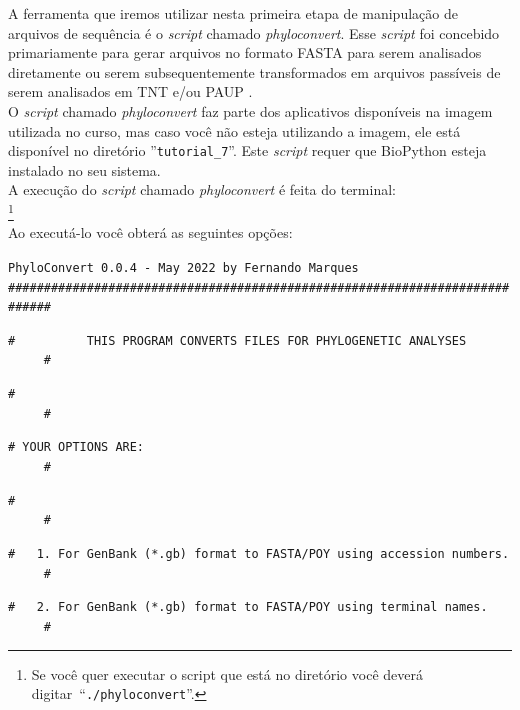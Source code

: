 \begin{refsection}
A ferramenta que iremos utilizar nesta primeira etapa de manipulação de arquivos de sequência é o \textit{script} chamado  \textit{phyloconvert}. Esse \textit{script} foi concebido primariamente para gerar arquivos no formato FASTA para serem analisados diretamente ou serem subsequentemente transformados em arquivos passíveis de serem analisados em TNT e/ou PAUP \parencite{Swofford_2003,GoloboffEtAl_2008}.\\

O \textit{script} chamado \textit{phyloconvert} faz parte dos aplicativos disponíveis na imagem utilizada no curso, mas caso você não esteja utilizando a imagem, ele está disponível no diretório ''\texttt{tutorial\_7}''. Este \textit{script} requer que BioPython esteja instalado no seu sistema.\\

	A execução do \textit{script} chamado \textit{phyloconvert} é feita do terminal:\\

\footnote{Se você quer executar o script que está no diretório você deverá digitar~``\texttt{./phyloconvert}''.}\\

Ao executá-lo você obterá as seguintes opções:\\

\scriptsize

\noindent\texttt{PhyloConvert~0.0.4~-~May~2022~by~Fernando~Marques}\\

\noindent\texttt{\#\#\#\#\#\#\#\#\#\#\#\#\#\#\#\#\#\#\#\#\#\#\#\#\#\#\#\#\#\#\#\#\#\#\#\#\#\#\#\#\#\#\#\#\#\#\#\#\#\#\#\#\#\#\#\#\#\#\#\#\#\#\#\#\#\#\#\#\#\#\#\#\#\#\#\#}

\noindent\texttt{\#~~~~~~~~~~THIS~PROGRAM~CONVERTS~FILES~FOR~PHYLOGENETIC~ANALYSES~~~~~~~~~~~\#}

\noindent\texttt{\#~~~~~~~~~~~~~~~~~~~~~~~~~~~~~~~~~~~~~~~~~~~~~~~~~~~~~~~~~~~~~~~~~~~~~~~~~~\#}

\noindent\texttt{\#~YOUR~OPTIONS~ARE:~~~~~~~~~~~~~~~~~~~~~~~~~~~~~~~~~~~~~~~~~~~~~~~~~~~~~~~~\#}

\noindent\texttt{\#~~~~~~~~~~~~~~~~~~~~~~~~~~~~~~~~~~~~~~~~~~~~~~~~~~~~~~~~~~~~~~~~~~~~~~~~~~\#}

\noindent\texttt{\#~~~1.~For~GenBank~(*.gb)~format~to~FASTA/POY~using~accession~numbers.~~~~~\#}

\noindent\texttt{\#~~~2.~For~GenBank~(*.gb)~format~to~FASTA/POY~using~terminal~names.~~~~~~~~\#}


\end{refsection}
